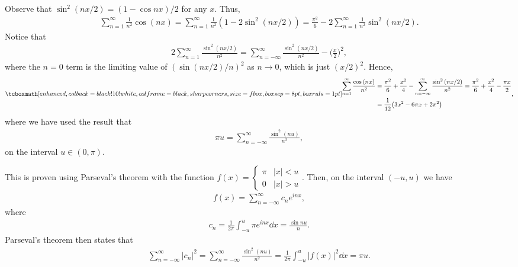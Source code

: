 
Observe that $\sin^2{(nx/2)} = (1 - \cos{nx})/2$ for any $x$.
Thus, 
\begin{eqnarray}
    \label{eq:sum-rewrite}
    \sum_{n=1}^{\infty} \frac{1}{n^2}\cos{(nx)} = \sum_{n=1}^{\infty} \frac{1}{n^2} (1 - 2\sin^2{(nx/2)}) = \frac{\pi^2}{6} - 2\sum_{n=1}^{\infty} \frac{1}{n^2} \sin^2{(nx/2)} 
.\end{eqnarray}
Notice that
\begin{eqnarray}
    \label{eq:2sin}
    2\sum_{n=1}^{\infty} \frac{\sin^2{(nx/2)}}{n^2} = \sum_{n=-\infty}^{\infty} \frac{\sin^2{(nx/2)}}{n^2} - \Big( \frac{x}{2} \Big)^2
,\end{eqnarray}
where the $n=0$ term is the limiting value of $(\sin{(nx/2)}/n)^2$ as $n \rightarrow 0$, which is just $(x/2)^2$.
Hence,
\begin{align}
    \label{eq:sum-rewrite-2}
    \eqbox{
        \begin{aligned}
    \sum_{n=1}^{\infty} \frac{\cos{(nx)}}{n^2} &= \frac{\pi^2}{6} + \frac{x^2}{4} - \sum_{n=-\infty}^{\infty} \frac{\sin^2{(nx/2)}}{n^2} = \frac{\pi^2}{6} + \frac{x^2}{4} - \frac{\pi x}{2} \\
                                               &= \frac{1}{12}\big( 3x^2 - 6 \pi x + 2\pi^2 \big)
        \end{aligned}
                                           }
,\end{align}
where we have used the result that 
\begin{eqnarray}
    \label{eq:result-used}
    \pi u = \sum_{n=-\infty}^{\infty} \frac{\sin^2{(nu)}}{n^2}
,\end{eqnarray}
on the interval $u \in (0,\pi)$.

This is proven using Parseval's theorem with the function $\displaystyle f(x) = \begin{cases} \pi & |x| < u \\ 0 & |x| > u \end{cases}$.
Then, on the interval $(-u,u)$ we have
\begin{eqnarray}
    \label{eq:f-fourier}
    f(x) = \sum_{n=-\infty}^{\infty} c_{n} e^{inx}
,\end{eqnarray}
where
\begin{eqnarray}
    \label{eq:cn}
    c_{n} = \frac{1}{2\pi}\int_{-u}^{u} \pi e^{inx} \dd{x} = \frac{\sin{nu}}{n}
.\end{eqnarray}
Parseval's theorem then states that
\begin{eqnarray}
    \label{eq:parseval}
    \sum_{n=-\infty}^{\infty} |c_{n}|^2 = \sum_{n=-\infty}^{\infty} \frac{\sin^2(nu)}{n^2} = \frac{1}{2\pi}\int_{-u}^{u} |f(x)|^2 \dd{x} = \pi u
.\end{eqnarray}







